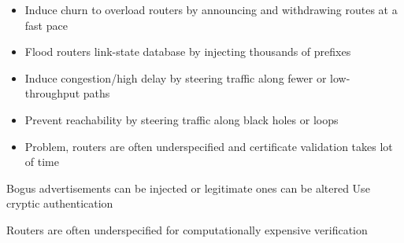 \begin{itemize}
\begin{itemize}
\begin{itemize}
                    \item Induce churn to overload routers by announcing and withdrawing routes at a fast pace
                    \item Flood routers link-state database by injecting thousands of prefixes
                    \item Induce congestion/high delay by steering traffic along fewer or low-throughput paths
                    \item Prevent reachability by steering traffic along black holes or loops
                \end{itemize}
                    \begin{itemize}
                        \item Problem, routers are often underspecified and certificate validation takes lot of time
                    \end{itemize}
        \end{itemize}
     Bogus advertisements can be injected or legitimate ones can be altered
     Use cryptic authentication
        \begin{itemize}
            \icon Routers are often underspecified for computationally  expensive verification
        \end{itemize}
\end{itemize}
